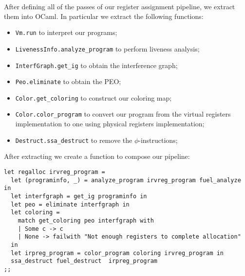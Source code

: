 After defining all of the passes of our register assignment pipeline, we extract them into OCaml.
In particular we extract the following functions:
\begin{itemize}
  \item \texttt{Vm.run} to interpret our programs;
  \item \texttt{LivenessInfo.analyze\_program} to perform liveness analysis;
  \item \texttt{InterfGraph.get\_ig} to obtain the interference graph;
  \item \texttt{Peo.eliminate} to obtain the PEO;
  \item \texttt{Color.get\_coloring} to construct our coloring map;
  \item \texttt{Color.color\_program} to convert our program from the virtual registers implementation to one using physical registers implementation;
  \item \texttt{Destruct.ssa\_destruct} to remove the $\phi$-instructions;
\end{itemize}

After extracting we create a function to compose our pipeline:

\begin{lstlisting}[style=OCaml]
let regalloc irvreg_program =
  let (programinfo, _) = analyze_program irvreg_program fuel_analyze in
  let interfgraph = get_ig programinfo in
  let peo = eliminate interfgraph in
  let coloring =
    match get_coloring peo interfgraph with
    | Some c -> c
    | None -> failwith "Not enough registers to complete allocation"
  in
  let irpreg_program = color_program coloring irvreg_program in
  ssa_destruct fuel_destruct  irpreg_program
;;
\end{lstlisting}